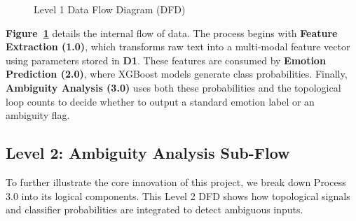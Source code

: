 \begin{figure}[H]
\caption{Level 1 Data Flow Diagram (DFD)}
\label{fig:dfd1}
\end{figure}

\textbf{Figure~\ref{fig:dfd1}} details the internal flow of data. The process begins with
\textbf{Feature Extraction (1.0)}, which transforms raw text into a multi-modal feature vector
using parameters stored in \textbf{D1}. These features are consumed by \textbf{Emotion
Prediction (2.0)}, where XGBoost models generate class probabilities. Finally,
\textbf{Ambiguity Analysis (3.0)} uses both these probabilities and the topological loop counts
to decide whether to output a standard emotion label or an ambiguity flag.

\subsection{Level 2: Ambiguity Analysis Sub-Flow}

To further illustrate the core innovation of this project, we break down Process 3.0 into its
logical components. This Level 2 DFD shows how topological signals and classifier
probabilities are integrated to detect ambiguous inputs.

